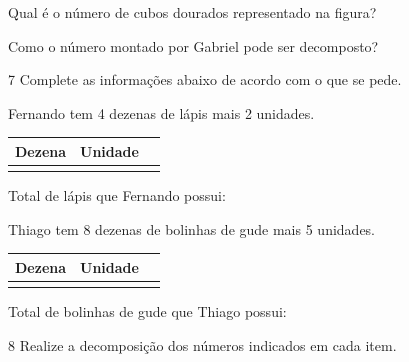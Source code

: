 \begin{escolha}
\item Qual é o número de cubos dourados representado na figura?

\pagebreak

\item Como o número montado por Gabriel pode ser decomposto?
\end{escolha}

\num{7} Complete as informações abaixo de acordo com o que se pede. 

\begin{escolha}
\item
  Fernando tem 4 dezenas de lápis mais 2 unidades.

\begin{longtable}[]{@{}lll@{}}
\toprule
\textbf{Dezena} & \textbf{Unidade}\tabularnewline
\midrule
\endhead
&\tabularnewline
\bottomrule
\end{longtable}


Total de lápis que Fernando possui:

\item Thiago tem 8 dezenas de bolinhas de gude mais 5 unidades.

\begin{longtable}[]{@{}lll@{}}
\toprule
\textbf{Dezena} & \textbf{Unidade}\tabularnewline
\midrule
\endhead
&\tabularnewline
\bottomrule
\end{longtable}

Total de bolinhas de gude que Thiago possui:
\end{escolha}

\num{8} Realize a decomposição dos números indicados em cada item.

